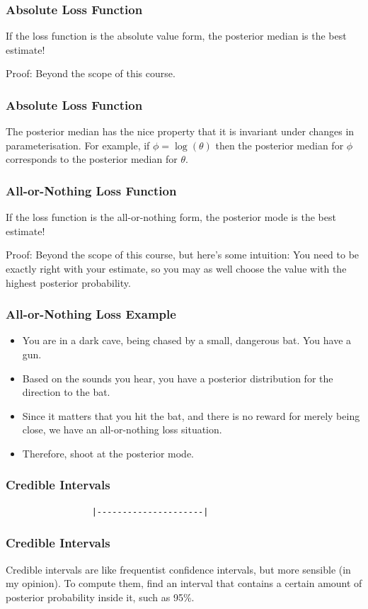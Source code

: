\documentclass{beamer}
\begin{document}
\begin{frame}
\frametitle{Absolute Loss Function}
If the loss function is the absolute value form,
the posterior median is the best estimate!\pause

Proof: Beyond the scope of this course.
\end{frame}


\begin{frame}
\frametitle{Absolute Loss Function}
The posterior median has the nice property that it is invariant under
changes in parameterisation. For example, if $\phi = \log(\theta)$ then
the posterior median for $\phi$ corresponds to the posterior median for
$\theta$.

\end{frame}


\begin{frame}
\frametitle{All-or-Nothing Loss Function}
If the loss function is the all-or-nothing form,
the posterior mode is the best estimate!\pause

Proof: Beyond the scope of this course, but here's some intuition:
You need to be exactly right with your estimate, so you may as well
choose the value with the highest posterior probability.
\end{frame}


\begin{frame}
\frametitle{All-or-Nothing Loss Example}
\begin{itemize}
\item You are in a dark cave, being chased by a small, dangerous bat. You have
a gun.\pause
\item Based on the sounds you hear, you have a posterior distribution for the
direction to the bat.\pause
\item Since it matters that you hit the bat, and there is no reward for
merely being close, we have an all-or-nothing loss situation.\pause
\item Therefore, shoot at the posterior mode.
\end{itemize}


\end{frame}


\begin{frame}[fragile]
\frametitle{Credible Intervals}
\begin{verbatim}
                 |---------------------|
\end{verbatim}

\end{frame}


\begin{frame}[fragile]
\frametitle{Credible Intervals}
Credible intervals are like frequentist confidence intervals, but more sensible
(in my opinion). To compute them, find an interval that contains a certain
amount of posterior probability inside it, such as 95\%.

\end{frame}
\end{document}
